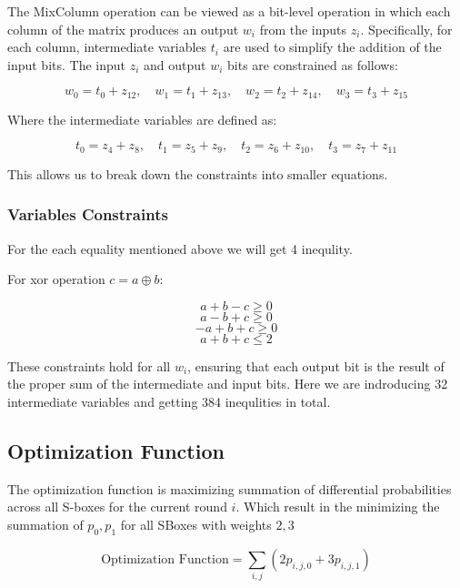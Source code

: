 The MixColumn operation can be viewed as a bit-level operation in which each column of the matrix produces an output \(w_i\) from the inputs \(z_i\). Specifically, for each column, intermediate variables \(t_i\) are used to simplify the addition of the input bits. The input \(z_i\) and output \(w_i\) bits are constrained as follows:

\[
    w_0 = t_0 + z_{12}, \quad w_1 = t_1 + z_{13}, \quad w_2 = t_2 + z_{14}, \quad w_3 = t_3 + z_{15}
\]

Where the intermediate variables are defined as:

\[
    t_0 = z_4 + z_8, \quad t_1 = z_5 + z_9, \quad t_2 = z_6 + z_{10}, \quad t_3 = z_7 + z_{11}
\]

This allows us to break down the constraints into smaller equations.

\subsubsection*{Variables Constraints}
For the each equality mentioned above we will get 4 inequlity.

For xor operation \( c = a \oplus b \):

\[
    a + b - c \geq 0
\]
\[
    a - b + c \geq 0
\]
\[
    -a + b + c \geq 0
\]
\[
    a + b + c \leq 2
\]

These constraints hold for all \(w_i\), ensuring that each output bit is the
result of the proper sum of the intermediate and input bits. Here we are indroducing
32 intermediate variables and getting 384 inequlities in total.

\subsection{Optimization Function}

The optimization function is maximizing summation of differential probabilities
across all S-boxes for the current round \( i \). Which result in the minimizing the
summation of $p_0,p_1$ for all SBoxes with weights $2,3$

\[
    \text{Optimization Function} = \sum_{i,j}^{} \left( 2p_{i,j,0} + 3p_{i,j,1} \right)
\]